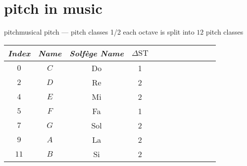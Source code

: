     \section[musical]{pitch in music}
        \begin{frame}{pitch}{musical pitch --- pitch classes 1/2}
            each octave is split into $12$ pitch classes
            \begin{figure}
            \scalebox{.8}
            {
                
            }
            \end{figure}

            \vspace{-8mm}
            \begin{footnotesize}
                \begin{table}
                    \centering
                    \begin{tabular}{cccccccccccc} %
                        \\ \hline
                        \bf{\emph{Index}}	 & \bf{\emph{Name}}	 & \bf{\emph{Solfège Name}}	 & \bf{\emph{$\Delta\mathrm{ST}$}}\\ 
                         \hline
                        \bf{$0$}	 & $C$	 & Do	 & 1\\
                        \bf{$2$}	 & $D$	 & Re	 & 2\\
                        \bf{$4$}	 & $E$	 & Mi	 & 2\\
                        \bf{$5$}	 & $F$	 & Fa	 & 1\\
                        \bf{$7$}	 & $G$	 & Sol	 & 2\\
                        \bf{$9$}	 & $A$	 & La	 & 2\\
                        \bf{$11$}	 & $B$	 & Si	 & 2\\
                    \end{tabular}
                \end{table}
            \end{footnotesize}
        \end{frame}
        
